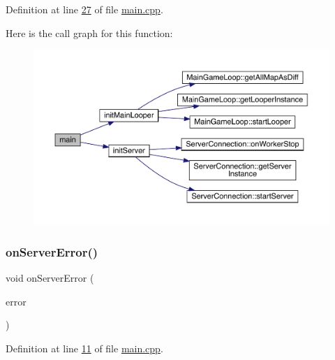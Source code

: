Definition at line \hyperlink{a00241_source_l00027}{27} of file \hyperlink{a00241_source}{main.\+cpp}.

Here is the call graph for this function\+:
\nopagebreak
\begin{figure}[H]
\begin{center}
\leavevmode
\includegraphics[width=350pt]{d6/db6/a00241_a0ddf1224851353fc92bfbff6f499fa97_cgraph}
\end{center}
\end{figure}
\mbox{\label{a00241_ab19c8b3d71e5789a489786830449e94b}} 
\subsubsection{\texorpdfstring{on\+Server\+Error()}{onServerError()}}
{\footnotesize\ttfamily void on\+Server\+Error (\begin{DoxyParamCaption}\item[{\hyperlink{a00104_a65727a063024ff0dedf1ac2f087f4165}{server\+Error}}]{error }\end{DoxyParamCaption})}



Definition at line \hyperlink{a00241_source_l00011}{11} of file \hyperlink{a00241_source}{main.\+cpp}.

